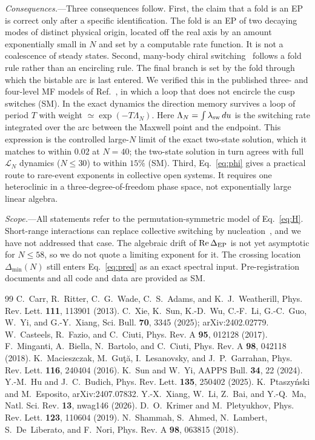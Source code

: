 \documentclass[aps,prl,twocolumn,superscriptaddress,amsmath,amssymb,reprint]{revtex4-2}
\newcommand{\Lc}{\mathcal{L}}
\begin{document}
\emph{Consequences.}---Three consequences follow. First, the claim that a fold is an EP is correct only after a specific identification. The fold is an EP of two decaying modes of distinct physical origin, located off the real axis by an amount exponentially small in $N$ and set by a computable rate function. It is not a coalescence of steady states. Second, many-body chiral switching~\cite{Xie2025} follows a fold rule rather than an encircling rule. The final branch is set by the fold through which the bistable arc is last entered. We verified this in the published three- and four-level MF models of Ref.~\cite{Xie2025}, in which a loop that does not encircle the cusp switches (SM). In the exact dynamics the direction memory survives a loop of period $T$ with weight $\simeq\exp(-T\Lambda_N)$. Here $\Lambda_N=\int\lambda_{\rm sw}\,du$ is the switching rate integrated over the arc between the Maxwell point and the endpoint. This expression is the controlled large-$N$ limit of the exact two-state solution, which it matches to within $0.02$ at $N=40$; the two-state solution in turn agrees with full $\Lc_N$ dynamics ($N\le30$) to within $15\%$ (SM). Third, Eq.~\eqref{eq:phi} gives a practical route to rare-event exponents in collective open systems. It requires one heteroclinic in a three-degree-of-freedom phase space, not exponentially large linear algebra.

\emph{Scope.}---All statements refer to the permutation-symmetric model of Eq.~\eqref{eq:H}. Short-range interactions can replace collective switching by nucleation~\cite{Xiang2026}, and we have not addressed that case. The algebraic drift of ${\rm Re}\,\Delta_{\rm EP}$ is not yet asymptotic for $N\le58$, so we do not quote a limiting exponent for it. The crossing location $\Delta_{\min}(N)$ still enters Eq.~\eqref{eq:pred} as an exact spectral input. Pre-registration documents and all code and data are provided as SM.

\begin{thebibliography}{99}
 C.~Carr, R.~Ritter, C.~G.~Wade, C.~S.~Adams, and K.~J.~Weatherill, Phys. Rev. Lett. \textbf{111}, 113901 (2013).
 C.~Xie, K.~Sun, K.-D.~Wu, C.-F.~Li, G.-C.~Guo, W.~Yi, and G.-Y.~Xiang, Sci. Bull. \textbf{70}, 3345 (2025); arXiv:2402.02779.
 W.~Casteels, R.~Fazio, and C.~Ciuti, Phys. Rev. A \textbf{95}, 012128 (2017).
 F.~Minganti, A.~Biella, N.~Bartolo, and C.~Ciuti, Phys. Rev. A \textbf{98}, 042118 (2018).
 K.~Macieszczak, M.~Gu\c{t}\u{a}, I.~Lesanovsky, and J.~P.~Garrahan, Phys. Rev. Lett. \textbf{116}, 240404 (2016).
 K.~Sun and W.~Yi, AAPPS Bull. \textbf{34}, 22 (2024).
 Y.-M.~Hu and J.~C.~Budich, Phys. Rev. Lett. \textbf{135}, 250402 (2025).
 K.~Ptaszy\'nski and M.~Esposito, arXiv:2407.07832.
 Y.-X.~Xiang, W.~Li, Z.~Bai, and Y.-Q.~Ma, Natl. Sci. Rev. \textbf{13}, nwag146 (2026).
 D.~O.~Krimer and M.~Pletyukhov, Phys. Rev. Lett. \textbf{123}, 110604 (2019).
 N.~Shammah, S.~Ahmed, N.~Lambert, S.~De~Liberato, and F.~Nori, Phys. Rev. A \textbf{98}, 063815 (2018).
\end{thebibliography}
\end{document}

